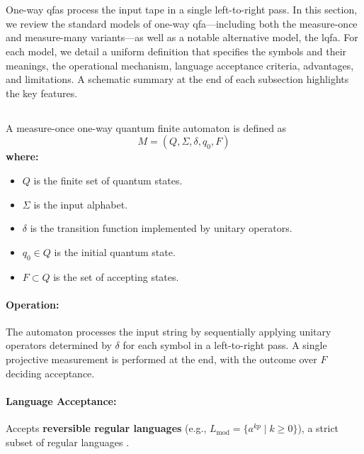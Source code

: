 \section{}
\label{sec:one-way-qfas}

One-way \glspl{qfa} process the input tape in a single left-to-right pass. In this section, we review the standard models of one-way \gls{qfa}—including both the measure-once and measure-many variants—as well as a notable alternative model, the \gls{lqfa}. For each model, we detail a uniform definition that specifies the symbols and their meanings, the operational mechanism, language acceptance criteria, advantages, and limitations. A schematic summary at the end of each subsection highlights the key features.

\subsection{}
\label{subsec:mo-1qfa}
\begin{definition}
A measure-once one-way quantum finite automaton is defined as 
\[
M = (Q, \Sigma, \delta, q_0, F)
\]
\textbf{where:}
\begin{itemize}
    \item \( Q \) is the finite set of quantum states.
    \item \( \Sigma \) is the input alphabet.
    \item \( \delta \) is the transition function implemented by unitary operators.
    \item \( q_0 \in Q \) is the initial quantum state.
    \item \( F \subset Q \) is the set of accepting states.
\end{itemize}
\end{definition}

\paragraph{Operation:}  
The automaton processes the input string by sequentially applying unitary operators determined by \( \delta \) for each symbol in a left-to-right pass. A single projective measurement is performed at the end, with the outcome over \( F \) deciding acceptance.

\paragraph{Language Acceptance:}  
Accepts \textbf{reversible regular languages} (e.g., \( L_{\text{mod}} = \{a^{kp} \mid k \geq 0\} \)), a strict subset of regular languages \cite{kondacs1997power}.
